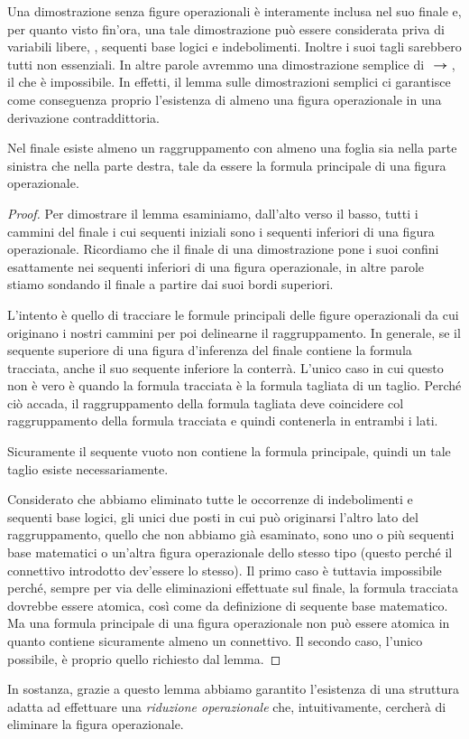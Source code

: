 		Una dimostrazione senza figure operazionali è interamente inclusa nel suo finale e, per quanto visto fin'ora, una tale dimostrazione può essere considerata priva di variabili libere, , sequenti base logici e indebolimenti. Inoltre i suoi tagli sarebbero tutti non essenziali. In altre parole avremmo una dimostrazione semplice di $\ \bm{\rightarrow} \; $, il che è impossibile. In effetti, il lemma sulle dimostrazioni semplici ci garantisce come conseguenza proprio l'esistenza di almeno una figura operazionale in una derivazione contraddittoria.
	\begin{lemma}
		Nel finale esiste almeno un raggruppamento con almeno una foglia sia nella parte sinistra che nella parte destra, tale da essere la formula principale di una figura operazionale.
	\end{lemma}
	\begin{proof}
		Per dimostrare il lemma esaminiamo, dall'alto verso il basso, tutti i cammini del finale i cui sequenti iniziali sono i sequenti inferiori di una figura operazionale. Ricordiamo che il finale di una dimostrazione pone i suoi confini esattamente nei sequenti inferiori di una figura operazionale, in altre parole stiamo sondando il finale a partire dai suoi bordi superiori.
		
		L'intento è quello di tracciare le formule principali delle figure operazionali da cui originano i nostri cammini per poi delinearne il raggruppamento.
		In generale, se il sequente superiore di una figura d'inferenza del finale contiene la formula tracciata, anche il suo sequente inferiore la conterrà. L'unico caso in cui questo non è vero è quando la formula tracciata è la formula tagliata di un taglio.
		Perché ciò accada, il raggruppamento della formula tagliata deve coincidere col raggruppamento della formula tracciata e quindi contenerla in entrambi i lati.
		
		Sicuramente il sequente vuoto non contiene la formula principale, quindi un tale taglio esiste necessariamente.
		
		Considerato che abbiamo eliminato tutte le occorrenze di indebolimenti e sequenti base logici, gli unici due posti in cui può originarsi l'altro lato del raggruppamento, quello che non abbiamo già esaminato, sono uno o più sequenti base matematici o un'altra figura operazionale dello stesso tipo (questo perché il connettivo introdotto dev'essere lo stesso).
		Il primo caso è tuttavia impossibile perché, sempre per via delle eliminazioni effettuate sul finale, la formula tracciata dovrebbe essere atomica, così come da definizione di sequente base matematico. Ma una formula principale di una figura operazionale non può essere atomica in quanto contiene sicuramente almeno un connettivo.
		Il secondo caso, l'unico possibile, è proprio quello richiesto dal lemma.
	\end{proof}
		In sostanza, grazie a questo lemma abbiamo garantito l'esistenza di una struttura adatta ad effettuare una \emph{riduzione operazionale} che, intuitivamente, cercherà di eliminare la figura operazionale.
